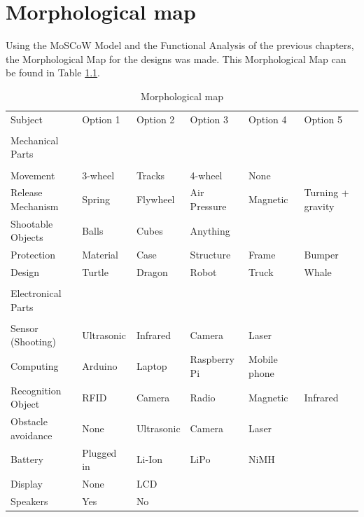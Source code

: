 \documentclass[11pt,twoside,a4paper]{report}
\begin{document}
\chapter{Morphological map}
Using the MoSCoW Model and the Functional Analysis of the previous chapters, the Morphological Map for the designs was made. This Morphological Map can be found in Table \ref{table:morphologicalmap}.

\begin{table}[h]

\begin{tabular}{llllll}
Subject            & Option 1          & Option 2   & Option 3     & Option 4     & Option 5          \\
                   &                   &            &              &              &                   \\
Mechanical Parts   &                   &            &              &              &                   \\
                   &                   &            &              &              &                   \\
Movement           & 3-wheel           & Tracks     & 4-wheel      & None         &                   \\
Release Mechanism  & Spring            & Flywheel   & Air Pressure & Magnetic     & Turning + gravity \\
Shootable Objects  & Balls             & Cubes      & Anything     &              &                   \\
Protection         & Material          & Case       & Structure    & Frame        & Bumper            \\
Design             & Turtle            & Dragon     & Robot        & Truck        & Whale             \\
                   &                   &            &              &              &                   \\
Electronical Parts &                   &            &              &              &                   \\
                   &                   &            &              &              &                   \\
Sensor (Shooting)  & Ultrasonic        & Infrared   & Camera       & Laser        &                   \\
Computing          & Arduino           & Laptop     & Raspberry Pi & Mobile phone &                   \\
Recognition Object & RFID              & Camera     & Radio        & Magnetic     & Infrared          \\
Obstacle avoidance & None              & Ultrasonic & Camera       & Laser        &                   \\
Battery            & Plugged in & Li-Ion     & LiPo         & NiMH         &                   \\
Display				& None & LCD & & & \\
Speakers 			& Yes & No & & & 
\end{tabular}

\caption{Morphological map}
\label{table:morphologicalmap}
\end{table}
\end{document}
